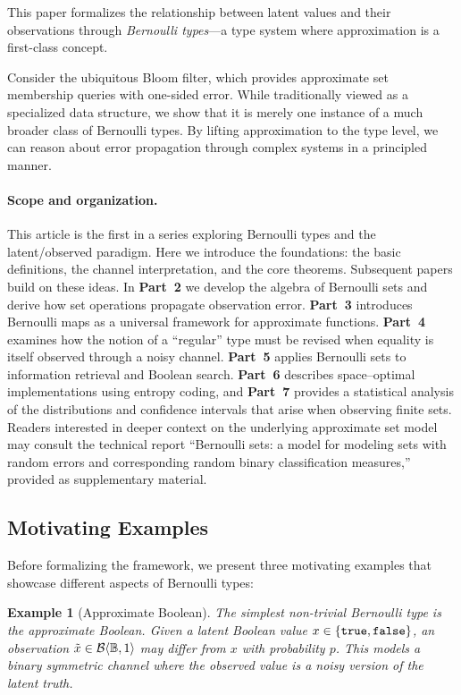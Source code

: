 \documentclass[11pt,final,hidelinks]{article}
\newtheorem{example}[theorem]{Example}
\newcommand{\bernoulli}[2]{\mathcal{B}\langle #1, #2 \rangle}
\begin{document}
This paper formalizes the relationship between latent values and their observations through \emph{Bernoulli types}—a type system where approximation is a first-class concept.

Consider the ubiquitous Bloom filter, which provides approximate set membership queries with one-sided error. While traditionally viewed as a specialized data structure, we show that it is merely one instance of a much broader class of Bernoulli types. By lifting approximation to the type level, we can reason about error propagation through complex systems in a principled manner.

\paragraph{Scope and organization.}  This article is the first in a series exploring Bernoulli types and the latent/observed paradigm.  Here we introduce the foundations: the basic definitions, the channel interpretation, and the core theorems.  Subsequent papers build on these ideas.  In \textbf{Part~2} we develop the algebra of Bernoulli sets and derive how set operations propagate observation error.  \textbf{Part~3} introduces Bernoulli maps as a universal framework for approximate functions.  \textbf{Part~4} examines how the notion of a ``regular'' type must be revised when equality is itself observed through a noisy channel.  \textbf{Part~5} applies Bernoulli sets to information retrieval and Boolean search.  \textbf{Part~6} describes space–optimal implementations using entropy coding, and \textbf{Part~7} provides a statistical analysis of the distributions and confidence intervals that arise when observing finite sets.  Readers interested in deeper context on the underlying approximate set model may consult the technical report ``Bernoulli sets: a model for modeling sets with random errors and corresponding random binary classification measures,'' provided as supplementary material.

\subsection{Motivating Examples}

Before formalizing the framework, we present three motivating examples that showcase different aspects of Bernoulli types:

\begin{example}[Approximate Boolean]
The simplest non-trivial Bernoulli type is the approximate Boolean. Given a latent Boolean value $x \in \{\mathtt{true}, \mathtt{false}\}$, an observation $\tilde{x} \in \bernoulli{\Bool}{1}$ may differ from $x$ with probability $p$. This models a binary symmetric channel where the observed value is a noisy version of the latent truth.
\end{example}
\end{document}
